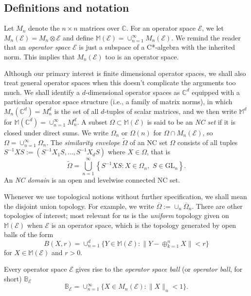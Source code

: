 \documentclass[12pt]{amsart}
\numberwithin{equation}{section}
\theoremstyle{definition}
\newcommand{\cE}{\mathcal{E}}
\newcommand{\bB}{\mathbb{B}}
\newcommand{\bC}{\mathbb{C}}
\newcommand{\bM}{\mathbb{M}}
\newcommand{\ol}{\overline}
\newcommand{\GL}{\mathrm{GL}}
\begin{document}
\subsection{Definitions and notation}


Let $M_n$ denote the $n \times n$ matrices over $\bC$. 
For an operator space $\cE$, we let $M_n(\cE) = M_n \otimes \cE$ and define $\bM(\cE) = \cup_{n=1}^\infty M_n(\cE)$. We remind the reader that an {\em operator space} $\cE$ is just a subspace of a C*-algebra with the inherited norm. 
This implies that $M_n(\cE)$ too is an operator space.

Although our primary interest is finite dimensional operator spaces, we shall also treat general operator spaces when this doesn't complicate the arguments too much. We shall identify a $d$-dimensional operator spaces as $\bC^d$ equipped with a particular operator space structure (i.e., a family of matrix norms), in which $M_n(\bC^d) = M_n^d$ is the set of all $d$-tuples of scalar matrices, and we then write $\bM^d$ for $\bM(\bC^d) = \cup_{n=1}^\infty M_n^d$. 
A subset $\Omega \subset \bM(\cE)$ is said to be an {\em NC set} if it is closed under direct sums. 
We write $\Omega_n$ or $\Omega(n)$ for $\Omega \cap M_n(\cE)$, so $\Omega = \cup_{n=1}^\infty \Omega_n$. 
The {\em similarity envelope} $\widetilde{\Omega}$ of an NC set $\Omega$ consists of all tuples $S^{-1} X S := (S^{-1}X_1S, \ldots, S^{-1}X_d S)$ where $X \in \Omega$, that is
\begin{equation}\label{eq:sim_env}
\widetilde{\Omega} = \bigcup_{n=1}^\infty\left\{S^{-1} X S : X \in \Omega_n, \,\, S \in \GL_n \right\}.
\end{equation}
An {\em NC domain} is an open and levelwise connected NC set. 

Whenever we use topological notions without further specification, we shall mean the disjoint union topology. 
For example, we write $\ol{\Omega} := \cup_n \ol{\Omega}_n$. 
There are other topologies of interest; most relevant for us is the {\em uniform} topology given on $\bM(\cE)$ when $\cE$ is an operator space, which is the topology generated by open balls of the form 
\[
B(X, r) = \cup_{n=1}^d \{Y \in \bM(\cE) : \|Y - \oplus_{k=1}^n X\|<r\} 
\]
for $X \in \bM(\cE)$ and $r>0$. 

Every operator space $\cE$ gives rise to the {\em operator space ball} (or {\em operator ball}, for short) $\bB_\cE$
\begin{equation}\label{eq:op_ball}
\bB_\cE = \cup_{n=1}^\infty \{X \in M_n(\cE) : \|X\|_n<1\}.
\end{equation}
\end{document}
